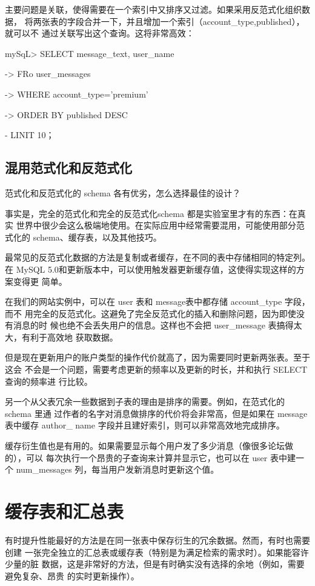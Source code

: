 主要问题是关联，使得需要在一个索引中又排序又过滤。如果采用反范式化组织数据，
将两张表的字段合并一下，并且增加一个索引（account\_type,published），就可以不
通过关联写出这个查询。这将非常高效：

mySqL> SELECT message\_text, user\_name

-> FRo user\_messages

-> WHERE account\_type='premium'

-> ORDER BY published DESC

- LINIT 10；

\subsection{混用范式化和反范式化}
范式化和反范式化的 schema 各有优劣，怎么选择最佳的设计？

事实是，完全的范式化和完全的反范式化schema 都是实验室里才有的东西：在真实
世界中很少会这么极端地使用。在实际应用中经常需要混用，可能使用部分范式化的
schema、缓存表，以及其他技巧。

最常见的反范式化数据的方法是复制或者缓存，在不同的表中存储相同的特定列。在
MySQL 5.0和更新版本中，可以使用触发器更新缓存值，这使得实现这样的方案变得更
简单。

在我们的网站实例中，可以在 user 表和 message表中都存储 account\_type 字段，而不
用完全的反范式化。这避免了完全反范式化的插入和删除问题，因为即使没有消息的时
候也绝不会丢失用户的信息。这样也不会把 user\_message 表搞得太大，有利于高效地
获取数据。

但是现在更新用户的账户类型的操作代价就高了，因为需要同时更新两张表。至于这会
不会是一个问题，需要考虑更新的频率以及更新的时长，并和执行 SELECT 查询的频率进
行比较。

另一个从父表冗余一些数据到子表的理由是排序的需要。例如，在范式化的 schema 里通
过作者的名字对消息做排序的代价将会非常高，但是如果在 message 表中缓存 author\_
name 字段并且建好索引，则可以非常高效地完成排序。

缓存衍生值也是有用的。如果需要显示每个用户发了多少消息（像很多论坛做的），可以
每次执行一个昂贵的子查询来计算并显示它，也可以在 user 表中建一个 num\_messages
列，每当用户发新消息时更新这个值。

\section{缓存表和汇总表}
有时提升性能最好的方法是在同一张表中保存衍生的冗余数据。然而，有时也需要创建
一张完全独立的汇总表或缓存表（特别是为满足检索的需求时）。如果能容许少量的脏
数据，这是非常好的方法，但是有时确实没有选择的余地（例如，需要避免复杂、昂贵
的实时更新操作）。

